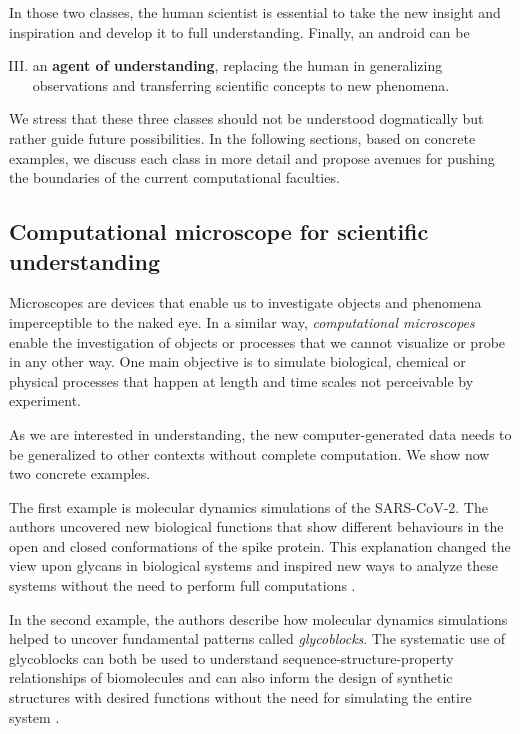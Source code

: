 In those two classes, the human scientist is essential to take the new insight and inspiration and develop it to full understanding. Finally, an android can be

\begin{enumerate}[I)]
\setcounter{enumi}{2}
\item an \textbf{agent of understanding}, replacing the human in generalizing observations and transferring scientific concepts to new phenomena.
\end{enumerate}

We stress that these three classes should not be understood dogmatically but rather guide future possibilities. In the following sections, based on concrete examples, we discuss each class in more detail and propose avenues for pushing the boundaries of the current computational faculties.


\subsection{Computational microscope for scientific understanding}
Microscopes are devices that enable us to investigate objects and phenomena imperceptible to the naked eye. In a similar way, \textit{computational microscopes} enable the investigation of objects or processes that we cannot visualize or probe in any other way. One main objective is to simulate biological, chemical or physical processes that happen at length and time scales not perceivable by experiment.

As we are interested in understanding, the new computer-generated data needs to be generalized to other contexts without complete computation\cite{de2005contextual}. We show now two concrete examples.

The first example is molecular dynamics simulations of the SARS-CoV-2. The authors uncovered new biological functions that show different behaviours in the open and closed conformations of the spike protein. This explanation changed the view upon glycans in biological systems and inspired new ways to analyze these systems without the need to perform full computations \cite{casalino2020beyond}.

In the second example, the authors describe how molecular dynamics simulations helped to uncover fundamental patterns called \textit{glycoblocks}. The systematic use of glycoblocks can both be used to understand sequence-structure-property relationships of biomolecules and can also inform the design of synthetic structures with desired functions without the need for simulating the entire system \cite{fogarty2020and}.



